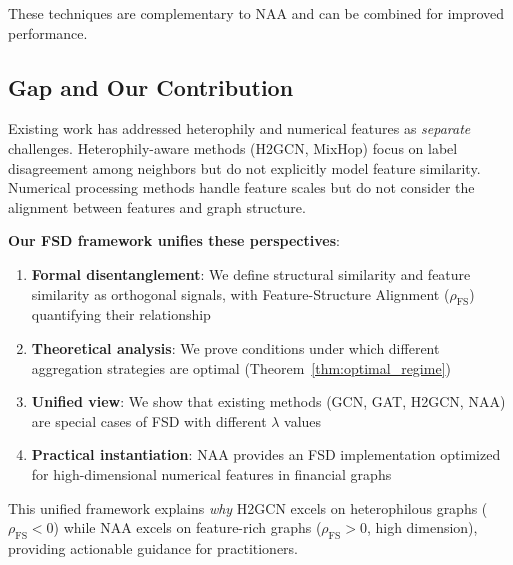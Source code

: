 These techniques are complementary to NAA and can be combined for improved performance.

\subsection{Gap and Our Contribution}

Existing work has addressed heterophily and numerical features as \textit{separate} challenges. Heterophily-aware methods (H2GCN, MixHop) focus on label disagreement among neighbors but do not explicitly model feature similarity. Numerical processing methods handle feature scales but do not consider the alignment between features and graph structure.

\textbf{Our FSD framework unifies these perspectives}:
\begin{enumerate}
\item \textbf{Formal disentanglement}: We define structural similarity and feature similarity as orthogonal signals, with Feature-Structure Alignment ($\rho_{\text{FS}}$) quantifying their relationship
\item \textbf{Theoretical analysis}: We prove conditions under which different aggregation strategies are optimal (Theorem~\ref{thm:optimal_regime})
\item \textbf{Unified view}: We show that existing methods (GCN, GAT, H2GCN, NAA) are special cases of FSD with different $\lambda$ values
\item \textbf{Practical instantiation}: NAA provides an FSD implementation optimized for high-dimensional numerical features in financial graphs
\end{enumerate}

This unified framework explains \textit{why} H2GCN excels on heterophilous graphs ($\rho_{\text{FS}} < 0$) while NAA excels on feature-rich graphs ($\rho_{\text{FS}} > 0$, high dimension), providing actionable guidance for practitioners.

